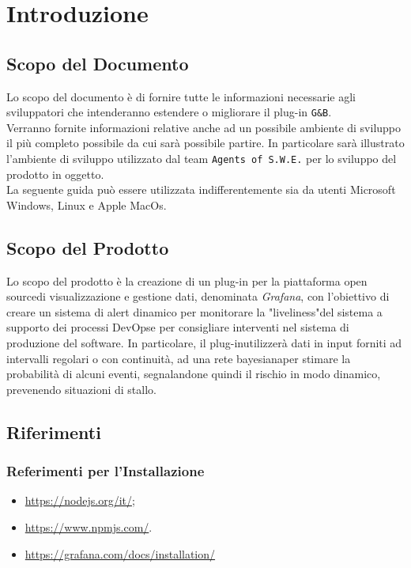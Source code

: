 \section{Introduzione}\label{Intro}
\subsection{Scopo del Documento}
Lo scopo del documento è di fornire tutte le informazioni necessarie agli sviluppatori che intenderanno estendere o migliorare il plug-in \texttt{G\&B}.\\
Verranno fornite informazioni relative anche ad un possibile ambiente di sviluppo il più completo possibile da cui sarà possibile partire. In particolare sarà illustrato l'ambiente di sviluppo utilizzato dal team \texttt{Agents of S.W.E.} per lo sviluppo del prodotto in oggetto.\\
La seguente guida può essere utilizzata indifferentemente sia da utenti Microsoft Windows, Linux e Apple MacOs.


\subsection{Scopo del Prodotto}
Lo scopo del prodotto è la creazione di un plug-in per la piattaforma open source\glossario di visualizzazione e gestione dati, denominata \textit{Grafana}\glossario , con l’obiettivo di creare un sistema di alert dinamico per monitorare la "liveliness"\glossario del sistema a supporto dei processi DevOps\glossario e per consigliare interventi nel sistema di produzione del software.
In particolare, il plug-in\glossario utilizzerà dati in input forniti ad intervalli regolari o con continuità, ad una rete bayesiana\glossario per stimare la probabilità di alcuni eventi, segnalandone quindi il rischio in modo dinamico, prevenendo situazioni di stallo.


\subsection{Riferimenti}\label{Riferimenti}
\subsubsection{Referimenti per l'Installazione}
\begin{itemize}
	\item \url{https://nodejs.org/it/};
	\item \url{https://www.npmjs.com/}.
	\item \url{https://grafana.com/docs/installation/}
\end{itemize}


